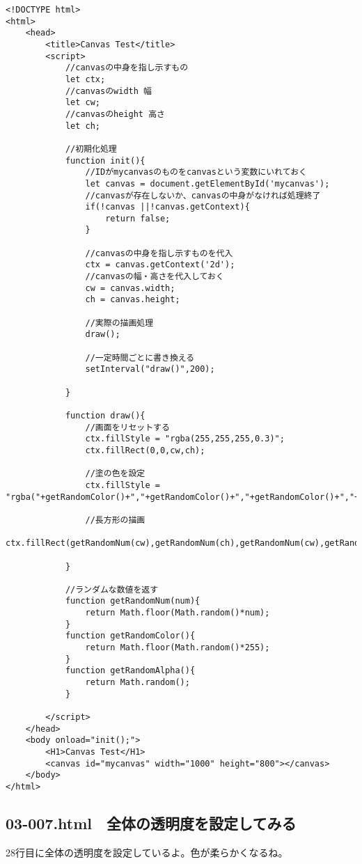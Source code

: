 \documentclass[mingoth,11pt,a4j,uplatex]{jsarticle}
\begin{document}
\begin{lstlisting}[caption=一定時間ごとにランダムな長方形を追加しよう]
<!DOCTYPE html>
<html>
	<head>
		<title>Canvas Test</title>
		<script>
			//canvasの中身を指し示すもの
			let ctx;
			//canvasのwidth 幅
			let cw;
			//canvasのheight 高さ
			let ch;
			
			//初期化処理
			function init(){
				//IDがmycanvasのものをcanvasという変数にいれておく
				let canvas = document.getElementById('mycanvas');
				//canvasが存在しないか、canvasの中身がなければ処理終了
				if(!canvas ||!canvas.getContext){
					return false;
				}
				
				//canvasの中身を指し示すものを代入
				ctx = canvas.getContext('2d');
				//canvasの幅・高さを代入しておく
				cw = canvas.width;
				ch = canvas.height;
				
				//実際の描画処理
				draw();
				
				//一定時間ごとに書き換える
				setInterval("draw()",200);

			}
			
			function draw(){
				//画面をリセットする
				ctx.fillStyle = "rgba(255,255,255,0.3)";
				ctx.fillRect(0,0,cw,ch);
				
				//塗の色を設定
				ctx.fillStyle = "rgba("+getRandomColor()+","+getRandomColor()+","+getRandomColor()+","+getRandomAlpha()+")";
				
				//長方形の描画
				ctx.fillRect(getRandomNum(cw),getRandomNum(ch),getRandomNum(cw),getRandomNum(ch));

			}
			
			//ランダムな数値を返す
			function getRandomNum(num){
				return Math.floor(Math.random()*num);
			}
			function getRandomColor(){
				return Math.floor(Math.random()*255);
			}
			function getRandomAlpha(){
				return Math.random();
			}

		</script>
	</head>
	<body onload="init();">
		<H1>Canvas Test</H1>
		<canvas id="mycanvas" width="1000" height="800"></canvas>
	</body>
</html>
\end{lstlisting}

\subsection{03-007.html　全体の透明度を設定してみる}
28行目に全体の透明度を設定しているよ。色が柔らかくなるね。
\end{document}
